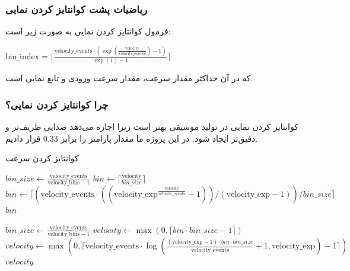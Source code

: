 \subsubsection{ریاضیات پشت کوانتایز کردن
      نمایی}

فرمول کوانتایز کردن نمایی به صورت زیر است:
\begin{LTR}
      \setmainfont{Times New Roman}
      $
            \text{bin\_index} = \lceil \frac{\text{velocity\_events} \cdot (\exp(\frac{\text{velocity}}{\text{velocity\_events}}) - 1)}{\exp(1) - 1} \rceil
      $
\end{LTR}
که در آن  حداکثر مقدار سرعت،  مقدار سرعت ورودی و
 تابع نمایی است.

\subsubsection{چرا کوانتایز کردن
      نمایی؟}
کوانتایز کردن نمایی در تولید موسیقی بهتر است زیرا اجازه می‌دهد صدایی
ظریف‌تر و دقیق‌تر ایجاد شود. در این پروژه ما مقدار پارامتر  را برابر $0.33$ قرار دادیم.

\begin{LTR}
      \begin{algorithm}
            \caption{کوانتایز کردن سرعت}
            \label{alg:velocity_quantization}
            \begin{algorithmic}
                  \setmainfont{Times New Roman}
                  \State $bin\_size \gets \frac{\text{velocity\_events}}{\text{velocity\_bins} - 1}$
                  \State $bin \gets \lceil \frac{\text{velocity}}{bin\_size} \rceil$
                  \Else
                  \State $bin \gets \lceil \left( \text{velocity\_events} \cdot \left( \left( \text{velocity\_exp}^{ \frac{\text{velocity}}{\text{velocity\_events}} } - 1 \right) \right) / (\text{velocity\_exp} - 1) \right) / bin\_size \rceil$
                  \EndIf
                  \State \Return $bin$
                  \EndProcedure

                  \State $bin\_size \gets \frac{\text{velocity\_events}}{\text{velocity\_bins} - 1}$
                  \State $velocity \gets \max(0, \lceil bin \cdot bin\_size - 1 \rceil)$
                  \Else
                  \State $velocity \gets \max(0, \lceil \text{velocity\_events} \cdot \log \left( \frac{(\text{velocity\_exp} - 1) \cdot bin \cdot bin\_size}{\text{velocity\_events}} + 1, \text{velocity\_exp} \right) - 1 \rceil)$
                  \EndIf
                  \State \Return $velocity$
                  \EndProcedure
            \end{algorithmic}
      \end{algorithm}
\end{LTR}


